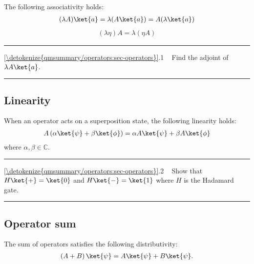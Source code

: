 \documentclass[letterpaper,10pt,english]{jupyterBook}
\begin{document}
\sphinxAtStartPar
The following associativity holds:
\begin{equation*}
\begin{split}
(\lambda A) \ket{a} = \lambda (A \ket{a}) = A (\lambda \ket{a})
\end{split}
\end{equation*}\begin{equation*}
\begin{split}
(\lambda \eta) A = \lambda (\eta A)
\end{split}
\end{equation*}

\bigskip\hrule\bigskip


\sphinxAtStartPar
{} \hyperref[\detokenize{qmsummary/operators:sec-operators}]{\ref{\detokenize{qmsummary/operators:sec-operators}}}.1     Find the adjoint of \(\lambda A \ket{a}\).


\bigskip\hrule\bigskip



\subsection{Linearity}
\label{\detokenize{qmsummary/operators:linearity}}
\sphinxAtStartPar
When an operator acts on a superposition state, the following linearity holds:
\begin{equation*}
\begin{split}
A \left(\alpha \ket{\psi} + \beta\ket{\phi}\right) = \alpha A \ket{\psi} + \beta A \ket{\phi}
\end{split}
\end{equation*}
\sphinxAtStartPar
where \(\alpha, \beta \in \mathbb{C}\).


\bigskip\hrule\bigskip


\sphinxAtStartPar
{} \hyperref[\detokenize{qmsummary/operators:sec-operators}]{\ref{\detokenize{qmsummary/operators:sec-operators}}}.2     Show that \(H\ket{+} = \ket{0}\) and \(H \ket{-} = \ket{1}\) where \(H\) is the Hadamard gate.


\bigskip\hrule\bigskip



\subsection{Operator sum}
\label{\detokenize{qmsummary/operators:operator-sum}}
\sphinxAtStartPar
The sum of operators satisfies the following distributivity:
\begin{equation*}
\begin{split}
\left(A+B\right)\ket{\psi} = A \ket{\psi} + B \ket{\psi}.
\end{split}
\end{equation*}
\end{document}
